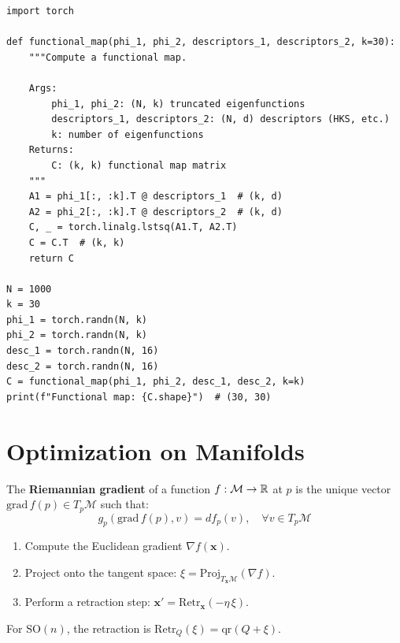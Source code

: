\begin{codeblock}[title=\textbf{Functional maps for shape correspondence}]
\begin{verbatim}
import torch

def functional_map(phi_1, phi_2, descriptors_1, descriptors_2, k=30):
    """Compute a functional map.

    Args:
        phi_1, phi_2: (N, k) truncated eigenfunctions
        descriptors_1, descriptors_2: (N, d) descriptors (HKS, etc.)
        k: number of eigenfunctions
    Returns:
        C: (k, k) functional map matrix
    """
    A1 = phi_1[:, :k].T @ descriptors_1  # (k, d)
    A2 = phi_2[:, :k].T @ descriptors_2  # (k, d)
    C, _ = torch.linalg.lstsq(A1.T, A2.T)
    C = C.T  # (k, k)
    return C

N = 1000
k = 30
phi_1 = torch.randn(N, k)
phi_2 = torch.randn(N, k)
desc_1 = torch.randn(N, 16)
desc_2 = torch.randn(N, 16)
C = functional_map(phi_1, phi_2, desc_1, desc_2, k=k)
print(f"Functional map: {C.shape}")  # (30, 30)
\end{verbatim}
\end{codeblock}

\section{Optimization on Manifolds}

\begin{definition}
The \textbf{Riemannian gradient} of a function $f: \mathcal{M} \to \mathbb{R}$ at $p$
is the unique vector $\mathrm{grad}\, f(p) \in T_p\mathcal{M}$ such that:
\[
    g_p(\mathrm{grad}\, f(p), v) = df_p(v), \quad \forall v \in T_p\mathcal{M}
\]
\end{definition}

\begin{algorithme}[title=\textbf{Riemannian gradient descent}]
\begin{enumerate}
    \item Compute the Euclidean gradient $\nabla f(\mathbf{x})$.
    \item Project onto the tangent space: $\xi = \mathrm{Proj}_{T_\mathbf{x}\mathcal{M}}(\nabla f)$.
    \item Perform a retraction step: $\mathbf{x}' = \mathrm{Retr}_\mathbf{x}(-\eta\, \xi)$.
\end{enumerate}
For $\mathrm{SO}(n)$, the retraction is $\mathrm{Retr}_Q(\xi) = \mathrm{qr}(Q + \xi)$.
\end{algorithme}

